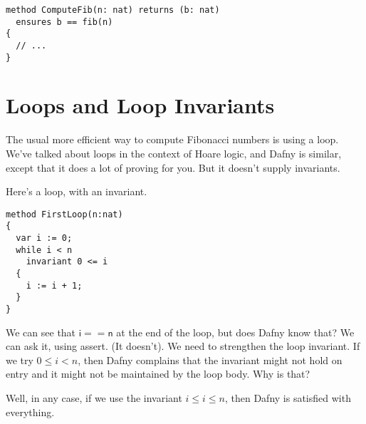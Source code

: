 \documentclass[11pt]{article}
\begin{document}
\begin{lstlisting}[language=dafny]
method ComputeFib(n: nat) returns (b: nat)
  ensures b == fib(n)
{
  // ...
}
\end{lstlisting}

\section*{Loops and Loop Invariants}
The usual more efficient way to compute Fibonacci numbers is using a loop. We've talked
about loops in the context of Hoare logic, and Dafny is similar, except that it does a lot of
proving for you. But it doesn't supply invariants.

Here's a loop, with an invariant.
\begin{lstlisting}[language=dafny]
method FirstLoop(n:nat)
{
  var i := 0;
  while i < n
    invariant 0 <= i
  {
    i := i + 1;
  }
}
\end{lstlisting}
We can see that $\mathsf{i == n}$ at the end of the loop, but does Dafny know that? We can ask it, using
\textsf{assert}. (It doesn't). We need to strengthen the loop invariant. If we try $0 \leq i < n$, then
Dafny complains that the invariant might not hold on entry and it might not be maintained by the loop body.
Why is that?

Well, in any case, if we use the invariant $i \leq i \leq n$, then Dafny is satisfied with everything.
\end{document}
